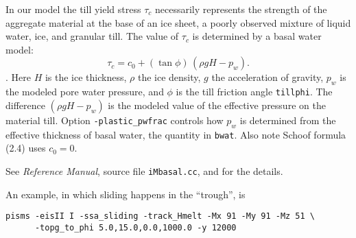 In our model the till yield stress $\tau_c$ necessarily represents the strength of the aggregate material at the base of an ice sheet, a poorly observed mixture of liquid water, ice, and granular till.  The value of $\tau_c$ is determined by a basal water model:
\begin{equation*}
   \tau_c = c_{0} + (\tan\phi)\,(\rho g H - p_w).
\end{equation*}
\cite[Chapter 8]{Paterson}.  Here $H$ is the ice thickness, $\rho$ the ice density, $g$ the acceleration of gravity, $p_w$ is the modeled pore water
pressure, and $\phi$ is the till friction angle \texttt{tillphi}.  The difference $(\rho g H - p_w)$ is the modeled value of the effective pressure on the material till.  Option \texttt{-plastic_pwfrac} controls how $p_w$ is determined from the effective thickness of basal water, the quantity in \texttt{bwat}. Also note Schoof \cite{SchoofStream} formula (2.4) uses $c_0 = 0$.

See \emph{Reference Manual}, source file \texttt{iMbasal.cc}, and \cite{BBssasliding} for the details.

An example, in which sliding happens in the ``trough'', is 
\begin{verbatim}
pisms -eisII I -ssa_sliding -track_Hmelt -Mx 91 -My 91 -Mz 51 \
      -topg_to_phi 5.0,15.0,0.0,1000.0 -y 12000
\end{verbatim}

